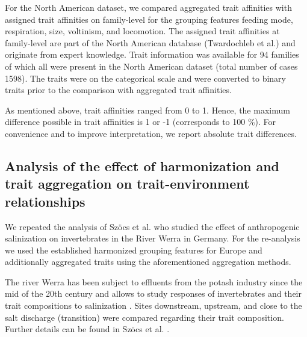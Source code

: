 \documentclass{article}
\begin{document}
For the North American dataset, we compared aggregated trait affinities with assigned trait affinities on family-level for the grouping features feeding mode, respiration, size, voltinism, and locomotion. The assigned trait affinities at family-level are part of the North American database (Twardochleb et al.) \cite{twardochleb_trait_data_2020} and originate from expert knowledge. Trait information was available for 94 families of which all were present in the North American dataset (total number of cases 1598). The traits were on the categorical scale and were converted to binary traits prior to the comparison with aggregated trait affinities.

As mentioned above, trait affinities ranged from 0 to 1. Hence, the maximum difference possible in trait affinities is 1 or -1 (corresponds to 100 \%). For convenience and to improve interpretation, we report absolute trait differences.


\subsection*{Analysis of the effect of harmonization and trait aggregation on trait-environment relationships}

We repeated the analysis of Szöcs et al. \cite{szocs_effects_2014} who studied the effect of anthropogenic salinization on invertebrates in the River Werra in Germany. For the re-analysis we used the established harmonized grouping features for Europe and additionally aggregated traits using the aforementioned aggregation methods. 

The river Werra has been subject to effluents from the potash industry since the mid of the 20th century and allows to study responses of invertebrates and their trait compositions to salinization \cite{bathe_biological_2011}.
Sites downstream, upstream, and close to the salt discharge (transition) were compared regarding their trait composition. Further details can be found in Szöcs et al. \cite{szocs_effects_2014}. 
\end{document}
